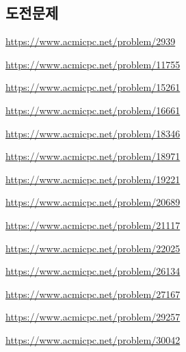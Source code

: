 \subsection{도전문제}
\begin{problem} \url{https://www.acmicpc.net/problem/2939} \end{problem}
\begin{problem} \url{https://www.acmicpc.net/problem/11755} \end{problem}
\begin{problem} \url{https://www.acmicpc.net/problem/15261} \end{problem}
\begin{problem} \url{https://www.acmicpc.net/problem/16661} \end{problem}
\begin{problem} \url{https://www.acmicpc.net/problem/18346} \end{problem}
\begin{problem} \url{https://www.acmicpc.net/problem/18971} \end{problem}
\begin{problem} \url{https://www.acmicpc.net/problem/19221} \end{problem}
\begin{problem} \url{https://www.acmicpc.net/problem/20689} \end{problem}
\begin{problem} \url{https://www.acmicpc.net/problem/21117} \end{problem}
\begin{problem} \url{https://www.acmicpc.net/problem/22025} \end{problem}
\begin{problem} \url{https://www.acmicpc.net/problem/26134} \end{problem}
\begin{problem} \url{https://www.acmicpc.net/problem/27167} \end{problem}
\begin{problem} \url{https://www.acmicpc.net/problem/29257} \end{problem}
\begin{problem} \url{https://www.acmicpc.net/problem/30042} \end{problem}
